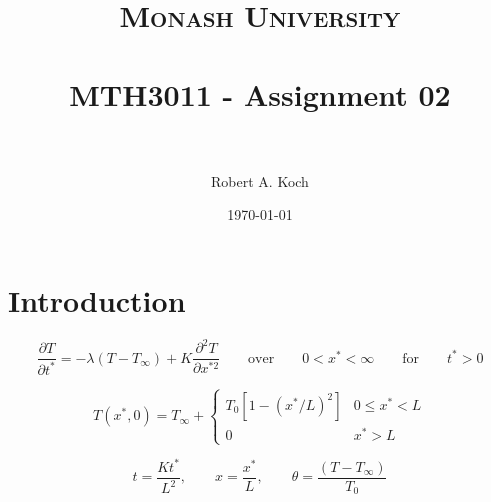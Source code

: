 \documentclass[paper=a4, fontsize=11pt]{scrartcl} %
\title{	
\normalfont \normalsize 
\textsc{Monash University} \\ [25pt] %
\horrule{0.5pt} \\[0.4cm] %
\huge MTH3011 - Assignment 02 \\ %
\horrule{2pt} \\[0.5cm] %
}
\author{Robert A. Koch} %
\date{\normalsize\today} %
\numberwithin{equation}{section} %
\numberwithin{figure}{section} %
\numberwithin{table}{section} %
\begin{document}
\maketitle %
\pagebreak


\section*{Introduction}

\begin{equation}
	\dfrac{\partial T}{\partial t^{*}} = -\lambda(T-T_{\infty})+K\dfrac{\partial^{2}T}{\partial x^{*2}} \qquad \mbox{over} \qquad 0<x^{*}<\infty \qquad \mbox{for} \qquad t^{*} > 0
\end{equation}

\begin{equation}
	T(x^{*},0) = T_{\infty} + 
	\begin{cases}
		T_{0}[1-(x^{*}/L)^{2}] & 0 \le x^{*} < L\\
		0 & x^{*} > L
	\end{cases}
\end{equation}


\begin{equation}
	t = \dfrac{Kt^{*}}{L^{2}}, \qquad x = \dfrac{x^{*}}{L}, \qquad \theta=\dfrac{(T-T_{\infty})}{T_{0}}
\end{equation}
\end{document}
